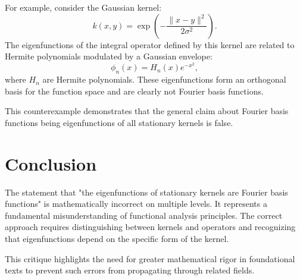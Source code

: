 \documentclass[12pt]{article}
\begin{document}
For example, consider the Gaussian kernel:
\[
k(x, y) = \exp\left(-\frac{\|x - y\|^2}{2\sigma^2}\right).
\]
The eigenfunctions of the integral operator defined by this kernel are related to Hermite polynomials modulated by a Gaussian envelope:
\[
\phi_n(x) = H_n(x)e^{-x^2},
\]
where $H_n$ are Hermite polynomials. These eigenfunctions form an orthogonal basis for the function space and are clearly not Fourier basis functions.

This counterexample demonstrates that the general claim about Fourier basis functions being eigenfunctions of all stationary kernels is false.

\section{Conclusion}
The statement that "the eigenfunctions of stationary kernels are Fourier basis functions" is mathematically incorrect on multiple levels. It represents a fundamental misunderstanding of functional analysis principles. The correct approach requires distinguishing between kernels and operators and recognizing that eigenfunctions depend on the specific form of the kernel.

This critique highlights the need for greater mathematical rigor in foundational texts to prevent such errors from propagating through related fields.
\end{document}
